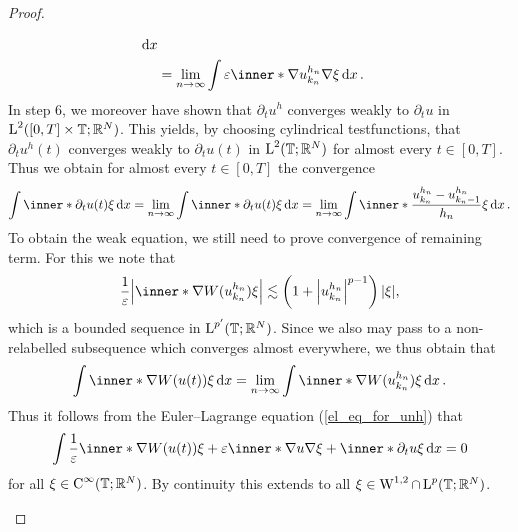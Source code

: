 \begin{proof}
\begin{description}[wide=0pt]
\begin{align*}
			\dd{x }
		\\
		& = 
		\lim_{ n \to \infty }
			\int
				\varepsilon
				\inner*{ \nabla u_{ k_{ n } }^{ h_{ n } } }{ \nabla \xi }
			\dd{ x }.
	\end{align*}
	In step 6, we moreover have shown that $ \partial_{ t } u^{ h } $ converges weakly to $ \partial_{t } u $ in $ \operatorname{L}^{ 2 } ( [ 0, T ] \times \operatorname{\mathbb{T}} ; \mathbb{ R }^{ N } ) $. This yields, by choosing cylindrical testfunctions, that $ \partial_{ t } u^{ h } ( t ) $ converges weakly to $ \partial_{ t } u ( t ) $ in $ \operatorname{L}^{ 2 } ( \operatorname{\mathbb{T}} ; \mathbb{ R }^{ N } ) $ for almost every $ t \in [ 0 , T ] $.
	Thus we obtain for almost every $ t\in [ 0 , T ] $ the convergence
	\begin{equation*}
		\int
			\inner*{ \partial_{ t } u ( t ) }{ \xi }
		\dd{ x }
		=
		\lim_{ n \to \infty }
			\int
				\inner*{ \partial_{ t } u ( t ) }{ \xi }
			\dd{ x }
		=
		\lim_{ n \to \infty }
			 \int
			 	\inner*{ \frac{ u_{ k_{ n } }^{ h_{ n } } - u_{ k_{ n } - 1 }^{ h_{ n } } }{ h_{ n } } }{ \xi }
			 \dd{ x }.
	\end{equation*}
	To obtain the weak equation, we still need to prove convergence of remaining term. For this we note that 
	\begin{equation*}
		\frac{ 1 }{ \varepsilon }
		\abs{ \inner*{ \nabla W ( u_{ k_{ n } }^{ h_{ n } } ) }{ \xi } }
		\lesssim
		\left( 1 + \abs{ u_{  k_{ n } }^{ h_{ n } } }^{ p - 1 } \right) \abs{ \xi },
	\end{equation*}
	which is a bounded sequence in $ \operatorname{L}^{ p'} ( \operatorname{\mathbb{T}} ; \mathbb{ R }^{ N } ) $. Since we also may pass to a non-relabelled subsequence which converges almost everywhere, we thus obtain that
	\begin{equation*}
		\int
			\inner*{ \nabla W ( u ( t ) ) }{ \xi } 
		\dd{ x }
		=
		\lim_{ n \to \infty }
			\int
				\inner*{ \nabla W ( u_{ k_{ n } }^{ h_{ n } } ) }{ \xi }
			\dd{ x }.
	\end{equation*}
	Thus it follows from the Euler--Lagrange equation (\ref{el_eq_for_unh}) that
	\begin{equation*}
		\int
			\frac{ 1 }{ \varepsilon }
			\inner*{ \nabla W ( u ( t )) }{ \xi }
			+
			\varepsilon
			\inner*{ \nabla u }{ \nabla \xi }
			+
			\inner*{ \partial_{ t } u }{ \xi }
		\dd{ x }
		=
		0
	\end{equation*}
	for all $ \xi \in \operatorname{C}^{ \infty } ( \operatorname{\mathbb{T}} ; \mathbb{ R }^{ N } ) $. By continuity this extends to all $ \xi \in \operatorname{W}^{ 1 , 2 } \cap \operatorname{L}^{ p } ( \mathbb{ T } ; \mathbb{ R }^{ N } ) $.
	

\end{description}
\end{proof}
